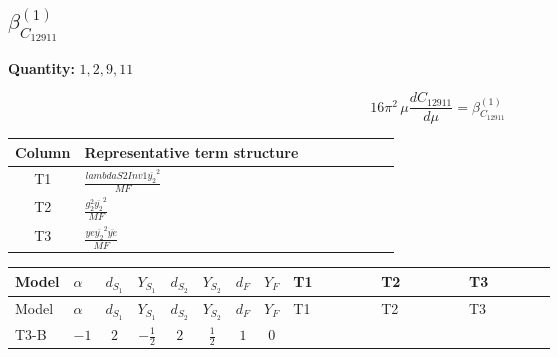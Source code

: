 \documentclass[8pt]{article}
\begin{document}
\begin{landscape}
\section*{$\beta_{C_{12911}}^{(1)}$}
\noindent\textbf{Quantity: }$\mathrm{1,2,9,11}$\par\smallskip
\[16\pi^2\,\mu\frac{d C_{12911}}{d\mu}=\beta_{C_{12911}}^{(1)}\]
\begin{center}
\begin{tabular}{@{}c >{\raggedright\arraybackslash}p{0.82\linewidth}@{}}
\toprule
Column & Representative term structure \\
\midrule
T1 & \(\displaystyle \frac{lambdaS2Inv1 \overline{y_{2}}^{2}}{MF}\) \\
\midrule
T2 & \(\displaystyle \frac{g_{2}^{2} \overline{y_{2}}^{2}}{MF}\) \\
\midrule
T3 & \(\displaystyle \frac{ye \overline{y_{2}}^{2} \overline{ye}}{MF}\) \\
\midrule
\bottomrule
\end{tabular}
\end{center}
\smallskip
\tiny
\begin{longtable}{@{}llcccccc >{\raggedright\arraybackslash}p{0.21\linewidth} >{\raggedright\arraybackslash}p{0.21\linewidth} >{\raggedright\arraybackslash}p{0.21\linewidth}@{}}
\toprule
Model & $\alpha$ & $d_{S_1}$ & $Y_{S_1}$ & $d_{S_2}$ & $Y_{S_2}$ & $d_F$ & $Y_F$ & T1 & T2 & T3 \\
\midrule
\endfirsthead
\toprule
Model & $\alpha$ & $d_{S_1}$ & $Y_{S_1}$ & $d_{S_2}$ & $Y_{S_2}$ & $d_F$ & $Y_F$ & T1 & T2 & T3 \\
\midrule
\endhead
T3-B & $-1$ & $2$ & $-\frac{1}{2}$ & $2$ & $\frac{1}{2}$ & $1$ & $0$ & \scriptsize\adjustbox{max width=\linewidth}{$\begin{gathered} \frac{lambdaS2Inv1 \overline{y_{2}}^{2}}{4 MF}\end{gathered}$} & \scriptsize\adjustbox{max width=\linewidth}{$\begin{gathered} \frac{3 g_{2}^{2} \overline{y_{2}}^{2}}{8 MF}\end{gathered}$} & \scriptsize\adjustbox{max width=\linewidth}{$\begin{gathered} - \frac{ye \overline{y_{2}}^{2} \overline{ye}}{8 MF}\end{gathered}$} \\
\midrule
\bottomrule
\end{longtable}
\clearpage

\end{landscape}
\end{document}

